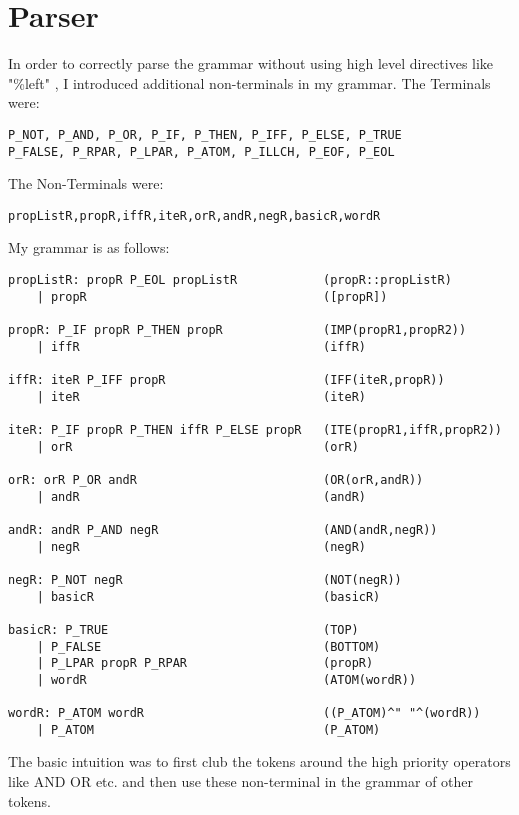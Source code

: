 \documentclass{article}
\begin{document}
\section{Parser}
In order to correctly parse the grammar without using high level directives like "\%left"
, I introduced additional non-terminals in my grammar. The Terminals were:\\
\begin{lstlisting}
P_NOT, P_AND, P_OR, P_IF, P_THEN, P_IFF, P_ELSE, P_TRUE
P_FALSE, P_RPAR, P_LPAR, P_ATOM, P_ILLCH, P_EOF, P_EOL
\end{lstlisting}
The Non-Terminals were:\\
\begin{lstlisting}
propListR,propR,iffR,iteR,orR,andR,negR,basicR,wordR
\end{lstlisting}
My grammar is as follows:
\begin{lstlisting}
propListR: propR P_EOL propListR            (propR::propListR)
    | propR                                 ([propR])

propR: P_IF propR P_THEN propR              (IMP(propR1,propR2))
    | iffR                                  (iffR)

iffR: iteR P_IFF propR                      (IFF(iteR,propR))
    | iteR                                  (iteR)

iteR: P_IF propR P_THEN iffR P_ELSE propR   (ITE(propR1,iffR,propR2))
    | orR                                   (orR)

orR: orR P_OR andR                          (OR(orR,andR))
    | andR                                  (andR)

andR: andR P_AND negR                       (AND(andR,negR))
    | negR                                  (negR)

negR: P_NOT negR                            (NOT(negR))
    | basicR                                (basicR)

basicR: P_TRUE                              (TOP)
    | P_FALSE                               (BOTTOM)
    | P_LPAR propR P_RPAR                   (propR)
    | wordR                                 (ATOM(wordR))

wordR: P_ATOM wordR                         ((P_ATOM)^" "^(wordR))
    | P_ATOM                                (P_ATOM)
\end{lstlisting}
The basic intuition was to first club the tokens around the high priority operators like AND OR etc.
and then use these non-terminal in the grammar of other tokens.
\end{document}
